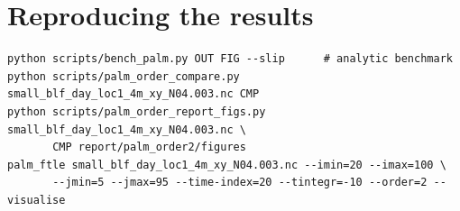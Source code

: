 \documentclass[11pt,a4paper]{article}
\begin{document}
\appendix
\section{Reproducing the results}

\begin{verbatim}
python scripts/bench_palm.py OUT FIG --slip      # analytic benchmark
python scripts/palm_order_compare.py small_blf_day_loc1_4m_xy_N04.003.nc CMP
python scripts/palm_order_report_figs.py small_blf_day_loc1_4m_xy_N04.003.nc \
       CMP report/palm_order2/figures
palm_ftle small_blf_day_loc1_4m_xy_N04.003.nc --imin=20 --imax=100 \
       --jmin=5 --jmax=95 --time-index=20 --tintegr=-10 --order=2 --visualise
\end{verbatim}
\end{document}
